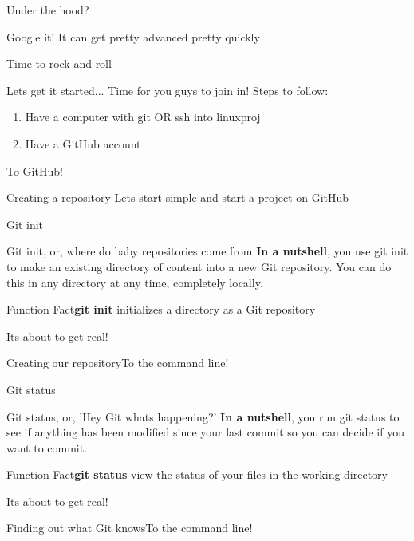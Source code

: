 \documentclass{beamer}
\newcommand{\demo}[1]{\begin{frame}{Its about to get real!}\begin{exampleblock}{#1}To the command line!\end{exampleblock}\end{frame}}
\newcommand{\clfact}[2]{\begin{alertblock}{Function Fact}\textbf{#1} #2\end{alertblock}}
\begin{document}
\begin{frame}{Under the hood?}
    \begin{block}{Google it!}
        It can get pretty advanced pretty quickly
    \end{block}
\end{frame}

\begin{frame}{Time to rock and roll}
    \begin{block}{Lets get it started...}
        Time for you guys to join in!
        Steps to follow:
        \begin{enumerate}
            \item Have a computer with git OR ssh into linuxproj
            \item Have a GitHub account
        \end{enumerate}
    \end{block}
\end{frame}
\begin{frame}{To GitHub!}
    \begin{exampleblock}{Creating a repository}
        Lets start simple and start a project on GitHub
    \end{exampleblock}
\end{frame}

\begin{frame}{Git init}
    \begin{block}{Git init, or, where do baby repositories come from}
    \textbf{In a nutshell}, you use git init to make an existing directory of content into a new Git repository.
    You can do this in any directory at any time, completely locally.
    
    \end{block}
    \clfact{git init}{initializes a directory as a Git repository}
\end{frame}
\demo{Creating our repository}

\begin{frame}{Git status}
    \begin{block}{Git status, or, 'Hey Git whats happening?'}
    \textbf{In a nutshell}, you run git status to see if anything has been modified since your last commit so you can decide if you want to commit.
    
    \end{block}
    \clfact{git status}{view the status of your files in the working directory}
\end{frame}
\demo{Finding out what Git knows}
\end{document}
